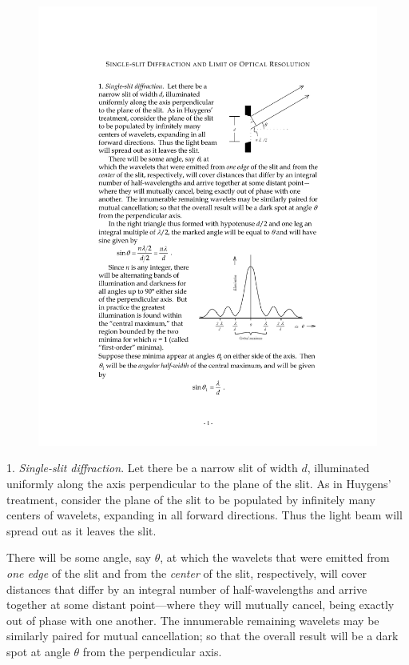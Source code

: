 \documentclass{article}
\begin{document}
\begin{figure}
\includegraphics{Figure1SSD.pdf}
\end{figure}

1. \emph{Single-slit diffraction}. Let there be a narrow slit of width
$d$, illuminated uniformly along the axis perpendicular to the
plane of the slit. As in Huygens' treatment, consider the plane of the
slit to be populated by infinitely many centers of wavelets, expanding
in all forward directions. Thus the light beam will spread out as it
leaves the slit.


There will be some angle, say $\theta$, at which the wavelets that were
emitted from \emph{one edge} of the slit and from the \emph{center} of
the slit, respectively, will cover distances that differ by an integral
number of half-wavelengths and arrive together at some distant
point---where they will mutually cancel, being exactly out of phase with
one another. The innumerable remaining wavelets may be similarly paired
for mutual cancellation; so that the overall result will be a dark spot
at angle $\theta$ from the perpendicular axis.
\end{document}
